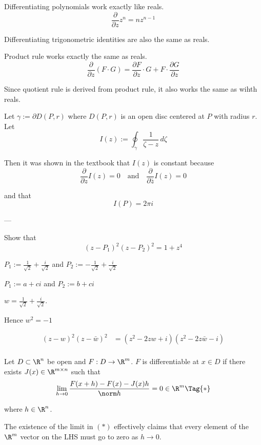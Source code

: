 \def\pp#1#2{\frac{\partial #1}{\partial #2}}

\label{f107aed}

Differentiating polynomials work exactly like reals.
$$
  \pp{}z z^n=nz^{n-1}
$$

Differentiating trigonometric identities are also the same as reals.

Product rule works exactly the same as reals.
$$
  \pp{}z(F\cdot G)=\pp Fz\cdot G+F\cdot\pp Gz
$$

Since quotient rule is derived from product rule, it also works the same as
wihth reals.

\label{fbc836e}

Let $\gamma:=\partial D(P,r)$ where $D(P,r)$ is an open disc centered at $P$
with radius $r$. Let
$$
  I(z):=\oint_\gamma\frac1{\zeta-z}\,d\zeta
$$

Then it was shown in the textbook that $I(z)$ is constant because
$$
  \pp{}zI(z)=0\quad\text{and}\quad\pp{}{\bar z}I(z)=0
$$

and that
$$
  I(P)=2\pi i
$$

---

Show that
$$
  (z-P_1)^2(z-P_2)^2=1+z^4
$$

$P_1:=\frac1{\sqrt2}+\frac i{\sqrt2}$ and $P_2:=-\frac1{\sqrt2}+\frac i{\sqrt2}$

$P_1:=a+ci$ and $P_2:=b+ci$

$w=\frac1{\sqrt2}+\frac i{\sqrt2}$.

Hence $w^2=-1$

\begin{align*}
  (z-w)^2(z-\bar w)^2
   & = (z^2-2zw+i)(z^2-2z\bar w-i) \\
\end{align*}

\newpage
{}\label{bcd0aa1}

Let $D\subset\R^n$ be open and $F:D\to\R^m$. $F$ is differentiable at $x\in D$
if there exists $J(x)\in\R^{m\times n}$ such that
\begin{equation*}
  \lim_{h\to0}\frac{F(x+h)-F(x)-J(x)h}{\norm h}=0\in\R^m\Tag{*}
\end{equation*}

where $h\in\R^n$.

The existence of the limit in $(*)$ effectively claims that every element of
the $\R^m$ vector on the LHS must go to zero as $h\to0$.

